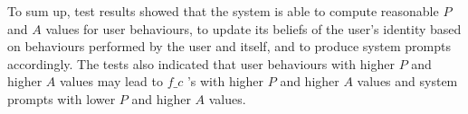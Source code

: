 To sum up, test results showed that the system is able to compute reasonable $P$ and $A$ values for user behaviours, to update its beliefs of the user's identity based on behaviours performed by the user and itself, and to produce system prompts accordingly. The tests also indicated that user behaviours with higher $P$ and higher $A$ values may lead to $f\_c$ 's with higher $P$ and higher $A$ values and system prompts with lower $P$ and higher $A$ values.
